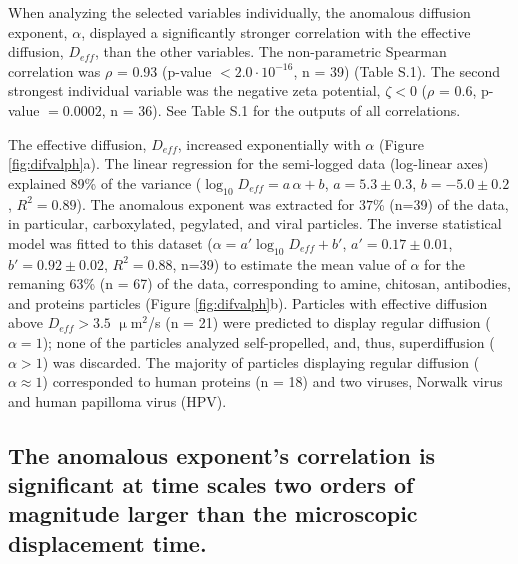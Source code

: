 \documentclass[aps,prl,preprint,superscriptaddress,showkeys,linenumbers]{revtex4-1}
\begin{document}
When analyzing the selected variables individually, the anomalous diffusion exponent, $\alpha$, displayed a significantly stronger correlation with the effective diffusion, $D_{eff}$, than the other variables. The non-parametric Spearman correlation was $\rho$ = 0.93 (p-value $< 2.0 \cdot 10^{-16 }$, n = 39) (Table S.1). The second strongest individual variable was the negative zeta potential, $\zeta < 0$ ($\rho$ = 0.6, p-value $=0.0002$, n = 36). See Table S.1 for the outputs of all correlations.

The effective diffusion, $D_{eff}$, increased exponentially with $\alpha$ (Figure \ref{fig:difvalph}a). The linear regression for the semi-logged data (log-linear axes) explained 89\% of the variance ($\log_{10} D_{eff} = a\, \alpha + b$, $a = 5.3 \pm 0.3$, $b = -5.0 \pm 0.2$, $R^2=0.89$). The anomalous exponent was extracted for $37$\% (n=39) of the data, in particular, carboxylated, pegylated, and viral particles. 
The inverse statistical model was fitted to this dataset ($\alpha = a' \log_{10} D_{eff} + b'$, $a' = 0.17 \pm 0.01$, $b' = 0.92 \pm 0.02$, $R^2 = 0.88$, n=39) to estimate the mean value of $\alpha$ for the remaning 63\% (n = 67) of the data, corresponding to amine, chitosan, antibodies, and proteins particles (Figure \ref{fig:difvalph}b). Particles with effective diffusion above $D_{eff} > 3.5$  $\upmu$m$^2$/s (n = 21) were predicted to display regular diffusion ($\alpha = 1$); none of the particles analyzed self-propelled, and, thus, superdiffusion ($\alpha > 1$) was discarded. The majority of particles displaying regular diffusion ($\alpha \approx 1$) corresponded to human proteins (n = 18) and two viruses, Norwalk virus and human papilloma virus (HPV). 


\subsection*{\textcolor{Antonio}{The anomalous exponent's correlation is significant at time scales two orders of magnitude larger than the microscopic displacement time}.}
\end{document}
